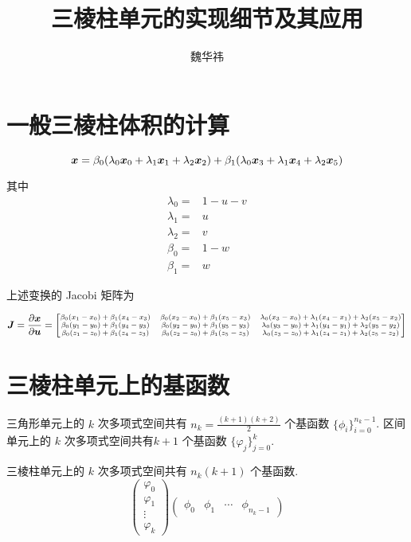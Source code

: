 \documentclass{article}
\begin{document}
\title{三棱柱单元的实现细节及其应用}
\author{魏华祎}
\date{\chntoday}
\maketitle
\section{一般三棱柱体积的计算}

$$
\boldsymbol x = \beta_0(\lambda_0 \boldsymbol x_0 + \lambda_1 \boldsymbol x_1 + \lambda_2 \boldsymbol x_2) + 
\beta_1(\lambda_0 \boldsymbol x_3 + \lambda_1 \boldsymbol x_4 + \lambda_2 \boldsymbol x_5)
$$

其中
\begin{align*}
    \lambda_0 =& 1 - u - v \\
    \lambda_1 =& u \\
    \lambda_2 =& v \\
    \beta_0 = & 1 - w\\
    \beta_1 = & w
\end{align*}

上述变换的 Jacobi 矩阵为

$$
\scriptsize
\boldsymbol J = \frac{\partial \boldsymbol x}{\partial \boldsymbol u}
= 
\begin{bmatrix}
    \beta_0(x_1 - x_0) + \beta_1(x_4 - x_3) & 
    \beta_0(x_2 - x_0) + \beta_1(x_5 - x_3) &
    \lambda_0(x_3 - x_0) + \lambda_1(x_4 - x_1) + \lambda_2(x_5 - x_2)\\
    \beta_0(y_1 - y_0) + \beta_1(y_4 - y_3) & 
    \beta_0(y_2 - y_0) + \beta_1(y_5 - y_3) &
    \lambda_0(y_3 - y_0) + \lambda_1(y_4 - y_1) + \lambda_2(y_5 - y_2)\\
    \beta_0(z_1 - z_0) + \beta_1(z_4 - z_3) & 
    \beta_0(z_2 - z_0) + \beta_1(z_5 - z_3) &
    \lambda_0(z_3 - z_0) + \lambda_1(z_4 - z_1) + \lambda_2(z_5 - z_2)\\
\end{bmatrix}
$$

\section{三棱柱单元上的基函数}

三角形单元上的 $k$ 次多项式空间共有 $n_k = \frac{(k+1)(k+2)}{2}$ 个基函数 
$\{\phi_i\}_{i=0}^{n_k-1}$. 区间单元上的 $k$ 次多项式空间共有$k+1$ 个基函数 $\{\varphi_j\}_{j=0}^{k}$.


三棱柱单元上的 $k$ 次多项式空间共有 $n_k(k+1)$ 个基函数.
$$
\begin{pmatrix}
    \varphi_0 \\ \varphi_1 \\ \vdots \\ \varphi_k
\end{pmatrix}
\begin{pmatrix}
    \phi_0 & \phi_1 & \cdots & \phi_{n_k-1}
\end{pmatrix}
$$
\end{document}
